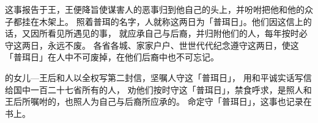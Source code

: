 {这事报告于王，王便降旨使{}谋害{}人的恶事归到他自己的头上，并吩咐把他和他的众子都挂在木架上。
照着普珥的名字，{}人就称这两日为「普珥日」。他们因这信上的话，又因所看见所遇见的事，
就应承自己与后裔，并归附他们的人，每年按时必守这两日，永远不废。
各省各城、家家户户、世世代代纪念遵守这两日，使这「普珥日」在{}人中不可废掉，在他们后裔中也不可忘记。
\par }{\PP {}的女儿—王后{}和{}人{}以全权写第二封信，坚嘱{}人守这「普珥日」，
用和平诚实话写信给{}{}国中一百二十七省所有的{}人，
劝他们按时守这「普珥日」，禁食呼求，是照{}人{}和王后{}所嘱咐的，也照{}人为自己与后裔所应承的。
命定守「普珥日」，这事也记录在书上。

\par }